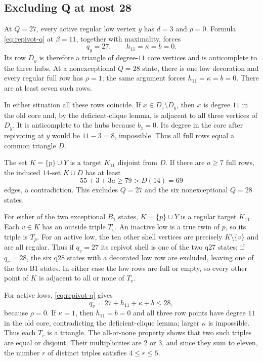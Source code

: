 \subsection{Excluding Q at most 28}

At $Q=27$, every active regular low vertex $y$ has $d=3$ and $\rho=0$. Formula \eqref{eq:repivot-q} at $\beta=11$, together with maximality, forces
\[
q_y=27,\qquad h_{11}=\kappa=b=0.
\]
Its row $D_y$ is therefore a triangle of degree-$11$ core vertices and is anticomplete to the three hubs. At a nonexceptional $Q=28$ state, there is one low decoration and every regular full row has $\rho=1$; the same argument forces $h_{11}=\kappa=b=0$. There are at least seven such rows.

In either situation all these rows coincide. If $x\in D_z\setminus D_y$, then $x$ is degree $11$ in the old core and, by the deficient-clique lemma, is adjacent to all three vertices of $D_y$. It is anticomplete to the hubs because $b_z=0$. Its degree in the core after repivoting at $y$ would be $11-3=8$, impossible. Thus all full rows equal a common triangle $D$.

The set $K=\{p\}\cup Y$ is a target $K_{11}$ disjoint from $D$. If there are $a\geq7$ full rows, the induced $14$-set $K\cup D$ has at least
\[
55+3+3a\geq79>D(14)=69
\]
edges, a contradiction. This excludes $Q=27$ and the six nonexceptional $Q=28$ states.

For either of the two exceptional $B_1$ states, $K=\{p\}\cup Y$ is a regular target $K_{11}$. Each $v\in K$ has an outside triple $T_v$. An inactive low is a true twin of $p$, so its triple is $T_p$. For an active low, the ten other shell vertices are precisely $K\setminus\{v\}$ and are all regular. Thus if $q_v=27$ its repivot shell is one of the two q27 states; if $q_v=28$, the six q28 states with a decorated low row are excluded, leaving one of the two B1 states. In either case the low rows are full or empty, so every other point of $K$ is adjacent to all or none of $T_v$.

For active lows, \cref{eq:repivot-q} gives
\[
q_v=27+h_{11}+\kappa+b\leq28,
\]
because $\rho=0$. If $\kappa=1$, then $h_{11}=b=0$ and all three row points have degree $11$ in the old core, contradicting the deficient-clique lemma; larger $\kappa$ is impossible. Thus each $T_v$ is a triangle. The all-or-none property shows that two such triples are equal or disjoint. Their multiplicities are $2$ or $3$, and since they sum to eleven, the number $r$ of distinct triples satisfies $4\leq r\leq5$.

